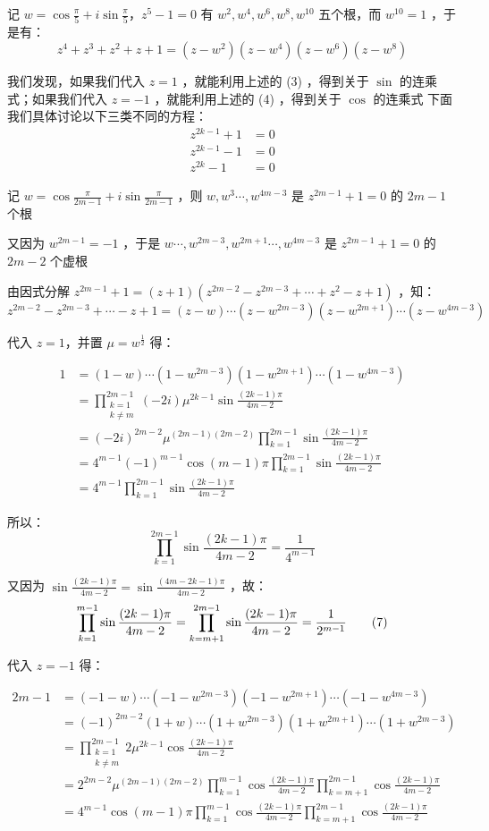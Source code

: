 记 $\displaystyle{w=\cos\frac{\pi}5+i\sin\frac{\pi}5}$，$z^5-1=0$ 有 $w^2,w^4,w^6,w^8,w^{10}$ 五个根，而 $w^{10}=1$ ，于是有：
$$z^4+z^3+z^2+z+1=(z-w^2)(z-w^4)(z-w^6)(z-w^8)$$

我们发现，如果我们代入 $z=1$ ，就能利用上述的 (3) ，得到关于 $\sin$ 的连乘式；如果我们代入 $z=-1$ ，就能利用上述的 (4) ，得到关于 $\cos$ 的连乘式
下面我们具体讨论以下三类不同的方程：
$$\begin{aligned}
z^{2k-1}+1&=0\\z^{2k-1}-1&=0 \\z^{2k}-1&=0
\end{aligned}$$

记 $\displaystyle{w=\cos\frac{\pi}{2m-1}+i\sin\frac{\pi}{2m-1}}$ ，则 $w,w^3\cdots,w^{4m-3}$ 是 $z^{2m-1}+1=0$ 的 $2m-1$ 个根

又因为 $w^{2m-1}=-1$ ，于是 $w\cdots ,w^{2m-3},w^{2m+1}\cdots ,w^{4m-3}$ 是 $z^{2m-1}+1=0$ 的 $2m-2$ 个虚根

由因式分解 $z^{2m-1}+1=(z+1)(z^{2m-2}-z^{2m-3}+\cdots+z^{2}-z+1)$ ，知：
$$z^{2m-2}-z^{2m-3}+\cdots-z+1=(z-w)\cdots(z-w^{2m-3})(z-w^{2m+1})\cdots(z-w^{4m-3})$$

代入 $z=1$，并置 $\mu=w^{\frac12}$ 得：

$$\begin{aligned}
1&=(1-w)\cdots(1-w^{2m-3})(1-w^{2m+1})\cdots(1-w^{4m-3})\\&=\prod_{\substack{k=1\\k\neq m}}^{2m-1}(-2i)\mu^{2k-1}\sin\frac{(2k-1)\pi}{4m-2}\\&=(-2i)^{2m-2}{\mu}^{(2m-1)(2m-2)}\prod_{k=1}^{2m-1}\sin{\frac{(2k-1)\pi}{4m-2}}\\ &=4^{m-1}(-1)^{m-1}\cos(m-1)\pi\prod_{k=1}^{2m-1}\sin{\frac{(2k-1)\pi}{4m-2}}\\ &=4^{m-1}\prod_{k=1}^{2m-1}\sin{\frac{(2k-1)\pi}{4m-2}}  
\end{aligned}$$

所以： 
$$
\prod_{k=1}^{2m-1}\sin{\frac{(2k-1)\pi}{4m-2}}=\frac{1}{4^{m-1}}\tag{6}
$$

又因为 $\displaystyle{\sin\frac{(2k-1)\pi}{4m-2}=\sin\frac{(4m-2k-1)\pi}{4m-2}}$ ，故：
$$
\prod_{k=1}^{m-1}\sin{\frac{(2k-1)\pi}{4m-2}}=\prod_{k=m+1}^{2m-1}\sin{\frac{(2k-1)\pi}{4m-2}}=\frac{1}{2^{m-1}}\\\tag{7}
$$

代入 $z=-1$ 得：

\begin{equation}
\begin{aligned}
2m-1&=(-1-w)\cdots(-1-w^{2m-3})(-1-w^{2m+1})\cdots(-1-w^{4m-3})\\ &=(-1)^{2m-2}(1+w)\cdots(1+w^{2m-3})(1+w^{2m+1})\cdots(1+w^{2m-3})\\ &=\prod_{\substack{k=1\\k\neq m}}^{2m-1}2\mu^{2k-1}\cos\frac{(2k-1)\pi}{4m-2}\\ &=2^{2m-2}\mu^{(2m-1)(2m-2)}\prod_{k=1}^{m-1}\cos{\frac{(2k-1)\pi}{4m-2}}\prod_{k=m+1}^{2m-1}\cos{\frac{(2k-1)\pi}{4m-2}}\\ &=4^{m-1}\cos(m-1)\pi\prod_{k=1}^{m-1}\cos{\frac{(2k-1)\pi}{4m-2}}\prod_{k=m+1}^{2m-1}\cos{\frac{(2k-1)\pi}{4m-2}}
\end{aligned}
\end{equation}

